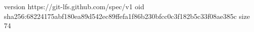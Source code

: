 version https://git-lfs.github.com/spec/v1
oid sha256:68224175abf180ea89d542ec89ffefa1f86b230bfcc0c3f182b5c33f08ae385c
size 74
